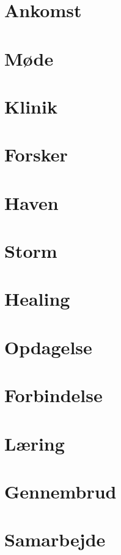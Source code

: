 \documentclass[12pt]{book}
\begin{document}
\tableofcontents
\newpage

\chapter{Ankomst}  %

\chapter{Møde}  %

\chapter{Klinik}  %

\chapter{Forsker}  %

\chapter{Haven}  %

\chapter{Storm}  %

\chapter{Healing}  %

\chapter{Opdagelse}  %

\chapter{Forbindelse}  %

\chapter{Læring}  %

\chapter{Gennembrud}  %

\chapter{Samarbejde}  %

\end{document}

